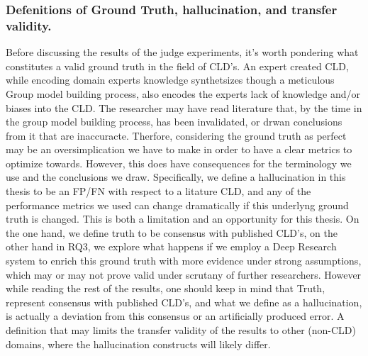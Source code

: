 \subsubsection{Defenitions of Ground Truth, hallucination, and transfer validity.}
Before discussing the results of the judge experiments, it's worth pondering what constitutes a valid ground truth in the field of CLD's.
An expert created CLD, while encoding domain experts knowledge synthetsizes though a meticulous Group model building process, also encodes the experts lack of knowledge and/or biases into the CLD. The researcher may have read literature that, by the time in the group model building process, has been invalidated, or drwan conclusions from it that are inaccuracte. Therfore, considering the ground truth as perfect may be an oversimplication we have to make in order to have a clear metrics to optimize towards. However, this does have consequences for the terminology we use and the conclusions we draw. Specifically, we define a hallucination in this thesis to be an FP/FN with respect to a litature CLD, and any of the performance metrics we used can change dramatically if this underlyng ground truth is changed. This is both a limitation and an opportunity for this thesis. On the one hand, we define truth to be consensus with published CLD's, on the other hand in RQ3, we explore what happens if we employ a Deep Research system to enrich this ground truth with more evidence under strong assumptions, which may or may not prove valid under scrutany of further researchers. 
However while reading the rest of the results, one should keep in mind that Truth, represent consensus with published CLD's, and what we define as a hallucination, is actually a deviation from this consensus or an artificially produced error. A definition that may limits the transfer validity of the results to other (non-CLD) domains, where the hallucination constructs will likely differ.

